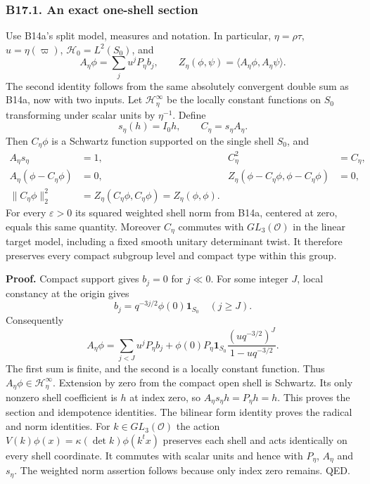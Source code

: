 \subsubsection{B17.1. An exact one-shell section}\label{b17.1.-an-exact-one-shell-section}

Use B14a's split model, measures and notation. In particular, \(\eta=\rho\tau\), \(u=\eta(\varpi)\), \(\mathcal H_0=L^2(S_0)\), and \[
 A_\eta\phi=\sum_j u^jP_\eta b_j,\qquad
 Z_\eta(\phi,\psi)=\langle A_\eta\phi,A_\eta\psi\rangle.
\] The second identity follows from the same absolutely convergent double sum as B14a, now with two inputs. Let \(\mathcal H_\eta^\infty\) be the locally constant functions on \(S_0\) transforming under scalar units by \(\eta^{-1}\). Define \[
 s_\eta(h)=I_0h,\qquad C_\eta=s_\eta A_\eta.
\] Then \(C_\eta\phi\) is a Schwartz function supported on the single shell \(S_0\), and \[
 \begin{aligned}
 A_\eta s_\eta&=1,& C_\eta^2&=C_\eta,\\
 A_\eta(\phi-C_\eta\phi)&=0,&
 Z_\eta(\phi-C_\eta\phi,\phi-C_\eta\phi)&=0,\\
 \|C_\eta\phi\|_2^2
 &=Z_\eta(C_\eta\phi,C_\eta\phi)
 =Z_\eta(\phi,\phi).
 \end{aligned}
\tag{B17.1}
\] For every \(\varepsilon>0\) its squared weighted shell norm from B14a, centered at zero, equals this same quantity. Moreover \(C_\eta\) commutes with \(GL_3(\mathcal O)\) in the linear target model, including a fixed smooth unitary determinant twist. It therefore preserves every compact subgroup level and compact type within this group.

\textbf{Proof.} Compact support gives \(b_j=0\) for \(j\ll0\). For some integer \(J\), local constancy at the origin gives \[
 b_j=q^{-3j/2}\phi(0)\mathbf1_{S_0}\quad(j\ge J).
\] Consequently \[
 A_\eta\phi
 =\sum_{j<J}u^jP_\eta b_j
 +\phi(0)P_\eta\mathbf1_{S_0}
       \frac{(u q^{-3/2})^J}{1-uq^{-3/2}}.
\tag{B17.2}
\] The first sum is finite, and the second is a locally constant function. Thus \(A_\eta\phi\in\mathcal H_\eta^\infty\). Extension by zero from the compact open shell is Schwartz. Its only nonzero shell coefficient is \(h\) at index zero, so \(A_\eta s_\eta h=P_\eta h=h\). This proves the section and idempotence identities. The bilinear form identity proves the radical and norm identities. For \(k\in GL_3(\mathcal O)\) the action \(V(k)\phi(x)=\kappa(\det k)\phi(k^t x)\) preserves each shell and acts identically on every shell coordinate. It commutes with scalar units and hence with \(P_\eta\), \(A_\eta\) and \(s_\eta\). The weighted norm assertion follows because only index zero remains. QED.

